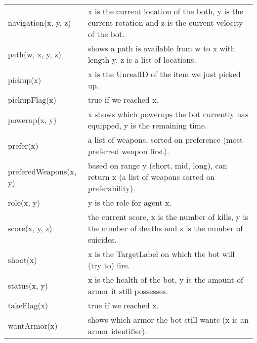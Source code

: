 \begin{tabular}{ l | p{12cm}}
  navigation(x, y, z) & x is the current location of the both, y is the current rotation and z is the current velocity of the bot. \\
  path(w, x, y, z) & shows a path is available from w to x with length y. z is a list of locations. \\
  pickup(x) & x is the UnrealID of the item we just picked up. \\
  pickupFlag(x) & true if we reached x. \\
  powerup(x, y) & x shows which powerups the bot currently has equipped, y is the remaining time. \\
  prefer(x) & a list of weapons, sorted on preference (most preferred weapon first). \\
  preferedWeapons(x, y) & based on range y (short, mid, long), can return x (a list of weapons sorted on preferability). \\
  role(x, y) & y is the role for agent x. \\
  score(x, y, z) & the current score, x is the number of kills, y is the number of deaths and z is the number of suicides. \\
  shoot(x) & x is the TargetLabel on which the bot will (try to) fire. \\
  status(x, y) & x is the health of the bot, y is the amount of armor it still possesses. \\
  takeFlag(x) & true if we reached x. \\
  wantArmor(x) & shows which armor the bot still wants (x is an armor identifier). \\
\end{tabular}